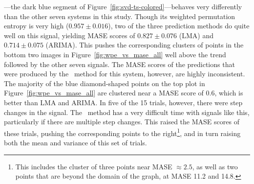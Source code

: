 \svdone---the dark blue segment of
Figure~\ref{fig:svd-ts-colored}---behaves very differently than the
other seven systems in this study.  Though its weighted permutation
entropy is very high ($0.957 \pm 0.016$), two of the three prediction
methods do quite well on this signal, yielding MASE scores of $0.827
\pm 0.076$ (LMA) and $0.714 \pm 0.075$ (ARIMA).  This pushes the
corresponding clusters of points in the bottom two images in
Figure~\ref{fig:wpe_vs_mase_all} well above the trend followed by the
other seven signals.  The MASE scores of the predictions that were
produced by the \naive ~method for this system, however, are highly
inconsistent.  The majority of the blue diamond-shaped points on the
top plot in Figure~\ref{fig:wpe_vs_mase_all} are clustered near a MASE
score of 0.6, which is better than LMA and ARIMA.  In five of the 15
\svdone trials, however, there were step changes in the signal.  The
\naive ~method has a very difficult time with signals like this,
particularly if there are multiple step changes.  This raised the MASE
scores of these trials, pushing the corresponding points to the
right\footnote{This includes the cluster of three points near MASE
  $\approx 2.5$, as well as two points that are beyond the domain of
  the graph, at MASE 11.2 and 14.8.}, and in turn raising both the
mean and variance of this set of trials.  

